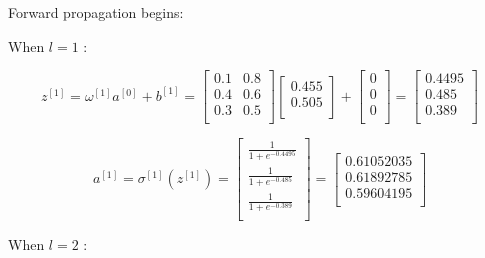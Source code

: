 \documentclass{article}
\begin{document}
Forward propagation begins:

When $l = 1$ :

\[
    z^{[1]} = \omega^{[1]} a^{[0]} + b^{[1]} = \begin{bmatrix}
        0.1 & 0.8 \\
        0.4 & 0.6 \\
        0.3 & 0.5 \\
    \end{bmatrix}
    \begin{bmatrix}
        0.455 \\
        0.505 \\
    \end{bmatrix}
    + \begin{bmatrix}
        0 \\
        0 \\
        0 \\
    \end{bmatrix}
    = \begin{bmatrix}
        0.4495 \\
        0.485  \\
        0.389  \\
    \end{bmatrix}
\]

\[
    a^{[1]} = \sigma^{[1]}(z^{[1]}) = \begin{bmatrix}
        \frac{1}{1+e^{-0.4495}} \\
        \frac{1}{1+e^{-0.485}}  \\
        \frac{1}{1+e^{-0.389}}  \\
    \end{bmatrix}
    = \begin{bmatrix}
        0.61052035 \\
        0.61892785 \\
        0.59604195 \\
    \end{bmatrix}
\]

When $l = 2$ :
\end{document}
